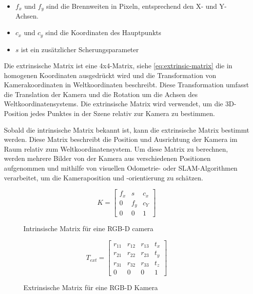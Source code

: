  \begin{itemize}
    \item $f_x$ und $f_y$ sind die Brennweiten in Pixeln, entsprechend den X- und Y-Achsen.
    \item $c_x$ und $c_y$ sind die Koordinaten des Hauptpunkts
    \item $s$ ist ein zusätzlicher Scherungsparameter
 \end{itemize}

Die extrinsische Matrix ist eine 4x4-Matrix, siehe \ref{eq:extrinsic-matrix} die in homogenen Koordinaten ausgedrückt wird und die Transformation von Kamerakoordinaten in Weltkoordinaten beschreibt. Diese Transformation umfasst die Translation der Kamera und die Rotation um die Achsen des Weltkoordinatensystems. Die extrinsische Matrix wird verwendet, um die 3D-Position jedes Punktes in der Szene relativ zur Kamera zu bestimmen.

Sobald die intrinsische Matrix bekannt ist, kann die extrinsische Matrix bestimmt werden. Diese Matrix beschreibt die Position und Ausrichtung der Kamera im Raum relativ zum Weltkoordinatensystem. Um diese Matrix zu berechnen, werden mehrere Bilder von der Kamera aus verschiedenen Positionen aufgenommen und mithilfe von visuellen Odometrie- oder SLAM-Algorithmen verarbeitet, um die Kameraposition und -orientierung zu schätzen.

\begin{figure}
    \begin{equation*}
        K = \begin{bmatrix}
        f_x & s & c_x \\
        0 & f_y & c_Y \\
        0 & 0 & 1
        \end{bmatrix}
        \end{equation*}
        \caption{Intrinsische Matrix für eine \ac{RGB-D} camera}
    \end{figure}  


    \begin{figure}
        \begin{equation*}
            T_{ext}=\begin{bmatrix}
                r_{11} & r_{12} & r_{13} & t_x\\
                r_{21} & r_{22} & r_{23} & t_y\\
                r_{31} & r_{32} & r_{33} & t_z\\
                0 & 0 & 0 & 1
                \end{bmatrix}   
        \end{equation*}
        \caption{Extrinsische Matrix für eine \ac{RGB-D} Kamera}
    \end{figure}
    
